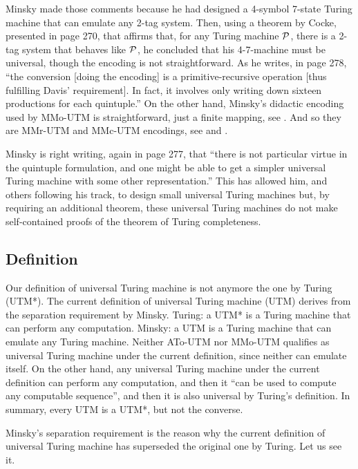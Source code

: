 Minsky made those comments because
he had designed a 4-symbol 7-state Turing machine
that can emulate any 2-tag system.
Then, using a theorem by Cocke, presented in page 270,
that affirms that, for any Turing machine $\cal P$,
 there is a 2-tag system that behaves like $\cal P$,
he concluded that his 4-7-machine must be universal,
though the encoding is not straightforward. As he writes,
in page 278, “the conversion [doing the encoding]
is a primitive-recursive operation
[thus fulfilling Davis' requirement]. In fact,
it involves only writing down sixteen productions
for each quintuple.”
On the other hand, Minsky's didactic encoding used by MMo-UTM
is straightforward, just a finite mapping, see .
And so they are MMr-UTM and MMc-UTM encodings,
 see  and .

Minsky is right writing, again in page 277, that
“there is not particular virtue in the quintuple formulation,
and one might be able to get a simpler universal Turing machine
with some other representation.”
This has allowed him, and others following his track,
to design small universal Turing machines but,
by requiring an additional theorem,
these universal Turing machines do not make
self-contained proofs of the theorem of Turing completeness.


\subsection{Definition}

Our definition of universal Turing machine
is not anymore the one by Turing (UTM*).
The current definition of universal Turing machine (UTM)
derives from the separation requirement by Minsky.
\beginpoints
\point Turing: a UTM* is a Turing machine that
can perform any computation.
\point Minsky: a UTM is a Turing machine that
 can emulate any Turing machine.
\endpoints
Neither ATo-UTM nor MMo-UTM qualifies as universal Turing machine
under the current definition,
since neither can emulate itself. On the other hand,
any universal Turing machine under the current definition
can perform any computation, and then it
“can be used to compute any computable sequence”,
and then it is also universal by Turing's definition.
In summary, every UTM is a UTM*, but not the converse.

Minsky's separation requirement is the reason why
the current definition of universal Turing machine
has superseded the original one by Turing. Let us see it.

